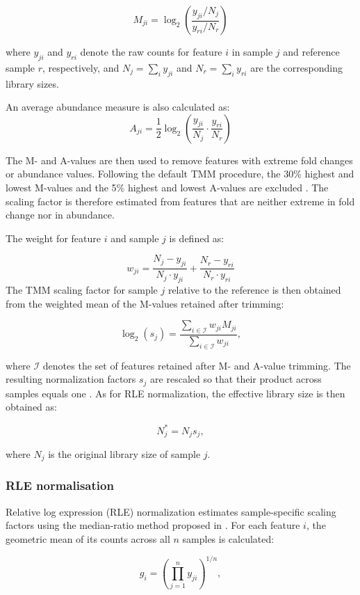 \begin{bibunit}[apalike]
\begin{appendices}
\[
M_{ji}=\log_{2}\left(\frac{y_{ji}/N_j}{y_{ri}/N_r}\right)
\]

where $y_{ji}$ and $y_{ri}$ denote the raw counts for feature $i$ in sample $j$ and reference sample $r$, respectively, and $N_j=\sum_i y_{ji}$ and $N_r=\sum_i y_{ri}$ are the corresponding library sizes.

An average abundance measure is also calculated as:
\[
A_{ji}=\frac{1}{2}\log_{2}\left(\frac{y_{ji}}{N_j}\cdot\frac{y_{ri}}{N_r}\right)
\]

The M- and A-values are then used to remove features with extreme fold changes or abundance values. Following the default TMM procedure, the 30\% highest and lowest M-values and the 5\% highest and lowest A-values are excluded \cite{robinson_scaling_2010}. The scaling factor is therefore estimated from features that are neither extreme in fold change nor in abundance.

The weight for feature $i$ and sample $j$ is defined as:

\[
w_{ji} = \frac{N_j - y_{ji}}{N_j \cdot y_{ji}} + \frac{N_r - y_{ri}}{N_r \cdot y_{ri}}
\]
The TMM scaling factor for sample $j$ relative to the reference is then obtained from the weighted mean of the M-values retained after trimming:

\[
\log_2(s_j)=\frac{\sum_{i \in \mathcal{I}} w_{ji} M_{ji}}{\sum_{i \in \mathcal{I}} w_{ji}},
\]

where $\mathcal{I}$ denotes the set of features retained after M- and A-value trimming. The resulting normalization factors $s_j$ are rescaled so that their product across samples equals one \citep{robinson_edger_2010}. As for RLE normalization, the effective library size is then obtained as:

\[
N_j^{*}=N_j s_j,
\]

where $N_j$ is the original library size of sample $j$.



\subsubsection*{RLE normalisation}

Relative log expression (RLE) normalization estimates sample-specific scaling factors using the median-ratio method proposed in \citep{anders_differential_2010}. For each feature $i$, the geometric mean of its counts across all $n$ samples is calculated:

$$
g_i=\left(\prod_{j=1}^{n}y_{ji}\right)^{1/n},
$$


\end{appendices}
\end{bibunit}
